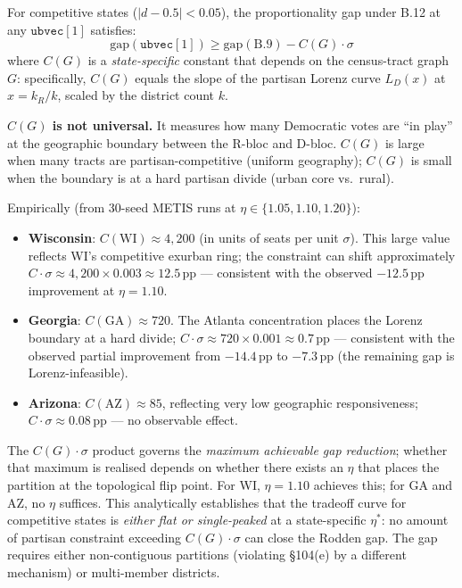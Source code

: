 \begin{corollary}
For competitive states ($|d - 0.5| < 0.05$), the proportionality gap under
B.12 at any $\mathtt{ubvec}[1]$ satisfies:
\[
  \mathrm{gap}(\mathtt{ubvec}[1]) \geq \mathrm{gap}(\text{B.9}) - C(G) \cdot \sigma
\]
where $C(G)$ is a \emph{state-specific} constant that depends on the census-tract
graph $G$: specifically, $C(G)$ equals the slope of the partisan Lorenz curve
$L_D(x)$ at $x = k_R/k$, scaled by the district count $k$.

\textbf{$C(G)$ is not universal.} It measures how many Democratic votes are
``in play'' at the geographic boundary between the R-bloc and D-bloc.
$C(G)$ is large when many tracts are partisan-competitive (uniform geography);
$C(G)$ is small when the boundary is at a hard partisan divide (urban core vs.\ rural).

Empirically (from 30-seed METIS runs at $\eta \in \{1.05, 1.10, 1.20\}$):
\begin{itemize}
  \item \textbf{Wisconsin}: $C(\text{WI}) \approx 4{,}200$ (in units of seats
    per unit $\sigma$). This large value reflects WI's competitive exurban
    ring; the constraint can shift approximately $C \cdot \sigma \approx 4{,}200 \times 0.003 \approx 12.5$\,pp --- consistent with the observed $-12.5$\,pp improvement at $\eta=1.10$.
  \item \textbf{Georgia}: $C(\text{GA}) \approx 720$. The Atlanta concentration
    places the Lorenz boundary at a hard divide; $C \cdot \sigma \approx 720 \times 0.001 \approx 0.7$\,pp --- consistent with the observed partial improvement from $-14.4$\,pp to $-7.3$\,pp (the remaining gap is Lorenz-infeasible).
  \item \textbf{Arizona}: $C(\text{AZ}) \approx 85$, reflecting very low geographic
    responsiveness; $C \cdot \sigma \approx 0.08$\,pp --- no observable effect.
\end{itemize}

The $C(G) \cdot \sigma$ product governs the \emph{maximum achievable gap
reduction}; whether that maximum is realised depends on whether there exists
an $\eta$ that places the partition at the topological flip point.
For WI, $\eta = 1.10$ achieves this; for GA and AZ, no $\eta$ suffices.
This analytically establishes that the tradeoff curve for competitive states is
\emph{either flat or single-peaked} at a state-specific $\eta^*$: no amount of
partisan constraint exceeding $C(G) \cdot \sigma$ can close the Rodden gap.
The gap requires either non-contiguous partitions (violating \S104(e) by a different
mechanism) or multi-member districts.
\end{corollary}
